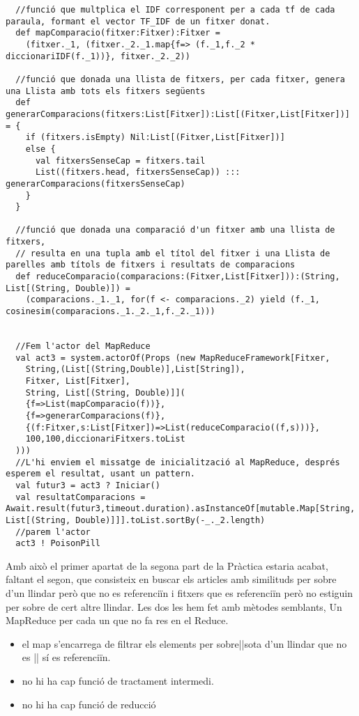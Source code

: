 \documentclass[11pt,a4paper,twoside]{report}
\begin{document}
\begin{lstlisting}
  //funció que multplica el IDF corresponent per a cada tf de cada paraula, formant el vector TF_IDF de un fitxer donat.
  def mapComparacio(fitxer:Fitxer):Fitxer =
    (fitxer._1, (fitxer._2._1.map{f=> (f._1,f._2 * diccionariIDF(f._1))}, fitxer._2._2))

  //funció que donada una llista de fitxers, per cada fitxer, genera una Llista amb tots els fitxers següents
  def generarComparacions(fitxers:List[Fitxer]):List[(Fitxer,List[Fitxer])] = {
    if (fitxers.isEmpty) Nil:List[(Fitxer,List[Fitxer])]
    else {
      val fitxersSenseCap = fitxers.tail
      List((fitxers.head, fitxersSenseCap)) ::: generarComparacions(fitxersSenseCap)
    }
  }

  //funció que donada una comparació d'un fitxer amb una llista de fitxers,
  // resulta en una tupla amb el títol del fitxer i una Llista de parelles amb títols de fitxers i resultats de comparacions
  def reduceComparacio(comparacions:(Fitxer,List[Fitxer])):(String, List[(String, Double)]) =
    (comparacions._1._1, for(f <- comparacions._2) yield (f._1, cosinesim(comparacions._1._2._1,f._2._1)))


  //Fem l'actor del MapReduce
  val act3 = system.actorOf(Props (new MapReduceFramework[Fitxer,
    String,(List[(String,Double)],List[String]),
    Fitxer, List[Fitxer],
    String, List[(String, Double)]](
    {f=>List(mapComparacio(f))},
    {f=>generarComparacions(f)},
    {(f:Fitxer,s:List[Fitxer])=>List(reduceComparacio((f,s)))},
    100,100,diccionariFitxers.toList
  )))
  //L'hi enviem el missatge de inicialització al MapReduce, després esperem el resultat, usant un pattern.
  val futur3 = act3 ? Iniciar()
  val resultatComparacions = Await.result(futur3,timeout.duration).asInstanceOf[mutable.Map[String, List[(String, Double)]]].toList.sortBy(-_._2.length)
  //parem l'actor
  act3 ! PoisonPill
\end{lstlisting}

Amb això el primer apartat de la segona part de la Pràctica estaria acabat, faltant el segon, que consisteix en buscar els articles amb similituds per sobre d'un llindar però que no es referenciïn 
i fitxers que es referenciïn però no estiguin per sobre de cert altre llindar. Les dos les hem fet amb mètodes semblants, Un MapReduce per cada un que no fa res en el Reduce.
\begin{itemize}
  \item el map s'encarrega de filtrar els elements per {sobre||sota} d'un llindar que {no es || sí es} referenciïn.
  \item no hi ha cap funció de tractament intermedi.
  \item no hi ha cap funció de reducció
\end{itemize}
\end{document}
